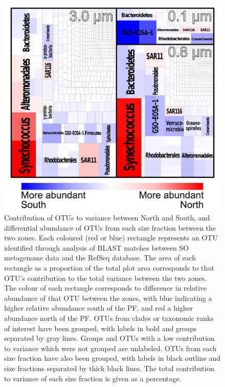\begin{figure}
  \centering
  \includegraphics[width=\textwidth]{../polarfront/taxotreemap.png}
  \caption[Contribution of \acp{OTU} to variance between the North and South zones]{Contribution of OTUs to variance between North and South, and differential abundance of OTUs from each size fraction between the two zones.
Each coloured (red or blue) rectangle represents an OTU identified through analysis of BLAST matches between SO metagenome data and the RefSeq database.
The area of each rectangle as a proportion of the total plot area corresponds to that OTU's contribution to the total variance between the two zones.
The colour of each rectangle corresponds to difference in relative abundance of that OTU between the zones, with blue indicating a higher relative abundance south of the PF, and red a higher abundance north of the PF.
OTUs from clades or taxonomic ranks of interest have been grouped, with labels in bold and groups separated by gray lines. 
Groups and OTUs with a low contribution to variance which were not grouped are unlabeled.
OTUs from each size fraction have also been grouped, with labels in black outline and size fractions separated by thick black lines. 
The total contribution to variance of each size fraction is given as a percentage.}
  \label{fig:taxotreemap}
\end{figure}
